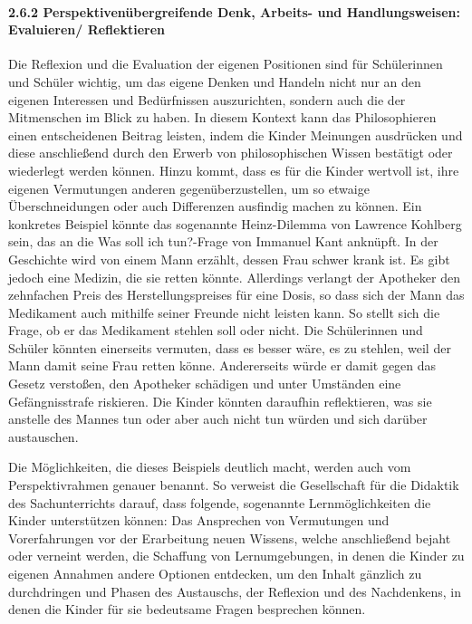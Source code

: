 \paragraph{2.6.2 Perspektivenübergreifende Denk, Arbeits- und Handlungsweisen: Evaluieren/ Reflektieren}


Die Reflexion und die Evaluation der eigenen Positionen sind für Schülerinnen und Schüler wichtig, um das eigene Denken und Handeln nicht nur an den eigenen Interessen und Bedürfnissen auszurichten, sondern auch die der Mitmenschen im Blick zu haben. 
In diesem Kontext kann das Philosophieren einen entscheidenen Beitrag leisten, indem die Kinder Meinungen ausdrücken und diese anschließend durch den Erwerb von philosophischen Wissen bestätigt oder wiederlegt werden können. 
Hinzu kommt, dass es für die Kinder wertvoll ist, ihre eigenen Vermutungen anderen gegenüberzustellen, um so etwaige Überschneidungen oder auch Differenzen ausfindig machen zu können. 
Ein konkretes Beispiel könnte das sogenannte \glqq Heinz-Dilemma\grqq{} von Lawrence Kohlberg sein, das an die \glqq Was soll ich tun?\grqq{}-Frage von Immanuel Kant anknüpft. 
In der Geschichte wird von einem Mann erzählt, dessen Frau schwer krank ist. 
Es gibt jedoch eine Medizin, die sie retten könnte.
 Allerdings verlangt der Apotheker den zehnfachen Preis des Herstellungspreises für eine Dosis, so dass sich der Mann das Medikament auch mithilfe seiner Freunde nicht leisten kann. 
 So stellt sich die Frage, ob er das Medikament stehlen soll oder nicht. 
 Die Schülerinnen und Schüler könnten einerseits vermuten, dass es besser wäre, es zu stehlen, weil der Mann damit seine Frau retten könne.
 Andererseits würde er damit gegen das Gesetz verstoßen, den Apotheker schädigen und unter Umständen eine Gefängnisstrafe riskieren. 
 Die Kinder könnten daraufhin reflektieren, was sie anstelle des Mannes tun oder aber auch nicht tun würden und sich darüber austauschen.

Die Möglichkeiten, die dieses Beispiels deutlich macht, werden auch vom Perspektivrahmen genauer benannt.
So verweist die Gesellschaft für die Didaktik des Sachunterrichts darauf, dass folgende, sogenannte \glqq Lernmöglichkeiten\grqq{} die Kinder unterstützen können:
Das Ansprechen von \glqq Vermutungen und Vorerfahrungen vor der Erarbeitung neuen Wissens\grqq{}\cite{GDS13, S.23}, welche anschließend bejaht oder verneint werden, die Schaffung von Lernumgebungen, in denen die Kinder zu eigenen Annahmen andere Optionen entdecken, um den Inhalt gänzlich zu durchdringen und Phasen des Austauschs, der Reflexion und des Nachdenkens, in denen die Kinder für sie bedeutsame Fragen besprechen können.


